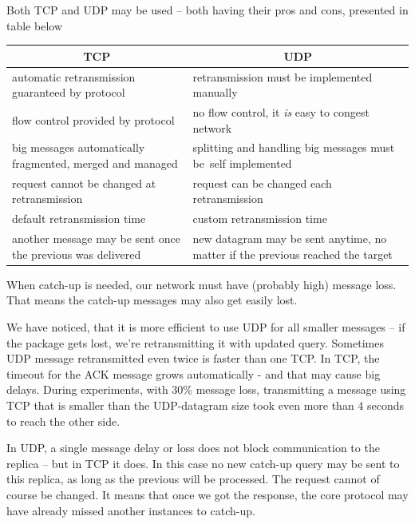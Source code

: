 Both TCP and UDP may be used -- both having their pros and cons, presented in table below

\begin{center}
  \begin{tabular}{m{}|m{}}
    \multicolumn{1}{c|}{ \textbf{TCP} }                          & \multicolumn{1}{c}{ \textbf{UDP} } \\ \hline
    automatic retransmission guaranteed by protocol             & retransmission must be implemented manually \\
    flow control provided by protocol                           & no flow control, it \emph{is} easy to congest network \\
    big messages automatically fragmented, mer\-ged and managed & splitting and handling big messages must be~self implemented \\
    request cannot be changed at retransmission                 & request can be changed each retransmission \\
    default retransmission time                                 & custom retransmission time \\
    another message may be sent once the previous was delivered & new datagram may be sent anytime, no matter if the previous reached the target \\
  \end{tabular}
\end{center}

When catch-up is needed,  our network must have (probably high) message loss. That means the catch-up messages may also get easily lost.

We have noticed, that it is more efficient to use UDP for all smaller messages -- if the package gets lost, we're retransmitting it with updated query. Sometimes UDP message retransmitted even twice is faster than one TCP. In TCP, the timeout for the ACK message grows automatically - and that may cause big delays. During experiments, with 30\% message loss, transmitting a message using TCP that is smaller than the UDP-datagram size took even more than 4 seconds 
to reach the other side.

In UDP, a single message delay or loss does not block communication to the replica -- but in TCP it does.
In this case no new catch-up query may be sent to this replica, as long as the previous will be processed. The request cannot of course be changed. It means that once we got the response, the core protocol may have already missed another instances to catch-up.

